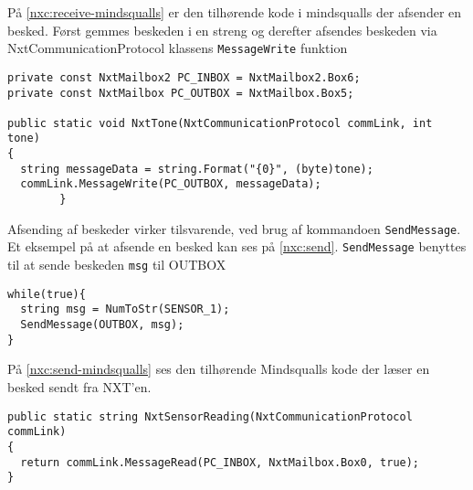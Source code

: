 På \cref{nxc:receive-mindsqualls} er den tilhørende kode i mindsqualls der afsender en besked.
Først gemmes beskeden i en streng og derefter afsendes beskeden via NxtCommunicationProtocol klassens \lstinline[style=c]|MessageWrite| funktion

\begin{lstlisting}[style=c, label=nxc:receive-mindsqualls,caption={Mindsqualls kode der afsender en besked}]
private const NxtMailbox2 PC_INBOX = NxtMailbox2.Box6;
private const NxtMailbox PC_OUTBOX = NxtMailbox.Box5;

public static void NxtTone(NxtCommunicationProtocol commLink, int tone)
{
  string messageData = string.Format("{0}", (byte)tone);
  commLink.MessageWrite(PC_OUTBOX, messageData);
        }
\end{lstlisting}

Afsending af beskeder virker tilsvarende, ved brug af kommandoen \lstinline[style=c]|SendMessage|.
Et eksempel på at afsende en besked kan ses på \cref{nxc:send}.
\lstinline[style=c]|SendMessage| benyttes til at sende beskeden \lstinline[style=c]|msg| til OUTBOX

\begin{lstlisting}[style=c,label=nxc:send,caption={Eksempel på afsending af besked}]
while(true){
  string msg = NumToStr(SENSOR_1);
  SendMessage(OUTBOX, msg);
}
\end{lstlisting}

På \cref{nxc:send-mindsqualls} ses den tilhørende Mindsqualls kode der læser en besked sendt fra NXT'en.

\begin{lstlisting}[style=c,label=nxc:send-mindsqualls,caption={Mindsqualls kode der læser en besked send fra NXT'en}]
public static string NxtSensorReading(NxtCommunicationProtocol commLink)
{
  return commLink.MessageRead(PC_INBOX, NxtMailbox.Box0, true);
}
\end{lstlisting}

